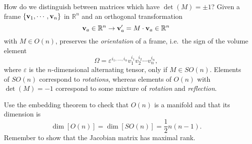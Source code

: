 How do we distinguish between matrices which have $\det(M) = \pm 1$?
Given a frame $\left\{ \vb{v}_1, \cdots, \vb{v}_n \right\}$ in $\mathbb{R}^n$ and an orthogonal transformation
\begin{equation}
  \vb{v}_a \in \mathbb{R}^n \to \vb{v}_a' = M \cdot \vb{v}_a \in \mathbb{R}^n
\end{equation}
with $M \in O(n)$, preserves the \emph{orientation} of a frame, i.e.~the sign of the volume element
\begin{equation}
  \Omega = \varepsilon^{i_1, \ldots, i_n} v_1^{i_1}v_2^{i_2} \cdots v_n^{i_n},
\end{equation}
where $\varepsilon$ is the $n$-dimensional alternating tensor, only if $M \in SO(n)$.
Elements of $SO(n)$ correspond to \emph{rotations}, whereas elements of $O(n)$ with $\det(M) = -1$ correspond to some mixture of \emph{rotation} and \emph{reflection}.

\begin{exercise}
  Use the embedding theorem to check that $O(n)$ is a manifold and that its dimension is
  \begin{equation}
    \dim[O(n)] = \dim[SO(n)] = \frac{1}{2}n(n-1).
  \end{equation}
  Remember to show that the Jacobian matrix has maximal rank.
\end{exercise}
